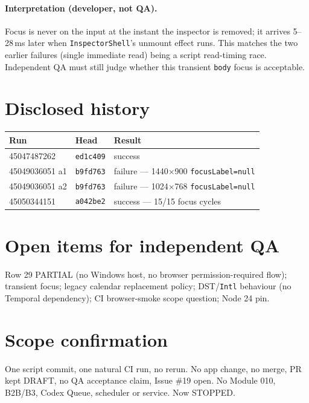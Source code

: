 \documentclass[11pt,a4paper]{article}
\newcommand{\sha}[1]{\texttt{\small #1}}
\begin{document}
\paragraph{Interpretation (developer, not QA).} Focus is never on the input at the instant the inspector is removed; it arrives 5--28\,ms later when \texttt{InspectorShell}'s unmount effect runs. This matches the two earlier failures (single immediate read) being a script read-timing race. Independent QA must still judge whether this transient \texttt{body} focus is acceptable.

\section{Disclosed history}
\begin{tabularx}{\textwidth}{@{}llX@{}}
\toprule
Run & Head & Result \\
\midrule
45047487262 & \sha{ed1c409} & success \\
45049036051 a1 & \sha{b9fd763} & failure --- 1440$\times$900 \texttt{focusLabel=null} \\
45049036051 a2 & \sha{b9fd763} & failure --- 1024$\times$768 \texttt{focusLabel=null} \\
45050344151 & \sha{a042be2} & success --- 15/15 focus cycles \\
\bottomrule
\end{tabularx}

\section{Open items for independent QA}
Row 29 PARTIAL (no Windows host, no browser permission-required flow); transient focus; legacy calendar replacement policy; DST/\texttt{Intl} behaviour (no Temporal dependency); CI browser-smoke scope question; Node 24 pin.

\section{Scope confirmation}
One script commit, one natural CI run, no rerun. No app change, no merge, PR kept DRAFT, no QA acceptance claim, Issue \#19 open. No Module 010, B2B/B3, Codex Queue, scheduler or service. Now STOPPED.
\end{document}
